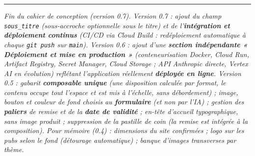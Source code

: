 \documentclass[11pt,a4paper]{article}
\begin{document}
\vspace{1em}
\hrule
\vspace{0.5em}
{\small\itshape Fin du cahier de conception (version 0.7). Version 0.7 : ajout du champ
\texttt{sous\_titre} (sous-accroche optionnelle sous le titre) et de l'\textbf{intégration
et déploiement continus} (CI/CD via Cloud Build : redéploiement automatique à chaque
\texttt{git push} sur \texttt{main}). Version 0.6 : ajout d'une
\textbf{section indépendante « Déploiement et mise en production »} (conteneurisation
Docker, Cloud Run, Artifact Registry, Secret Manager, Cloud Storage ; API Anthropic
directe, Vertex AI en évolution) reflétant l'application réellement \textbf{déployée en
ligne}. Version 0.5 : gabarit \textbf{composable unique} (une disposition calculée par
format, le contenu occupe tout l'espace et est mis à l'échelle, sans débordement) ;
image, bouton et couleur de fond choisis au \textbf{formulaire} (et non par l'IA) ;
gestion des \textbf{paliers} de remise et de la \textbf{date de validité} ; en-tête
d'accueil typographique, sans image produit ; suppression de la pastille de coin (la
remise est intégrée à la composition). Pour mémoire (0.4) : dimensions du site
confirmées ; logo sur les pubs selon le fond (détourage automatique) ; banque d'images
transverses par thème.}
\end{document}
